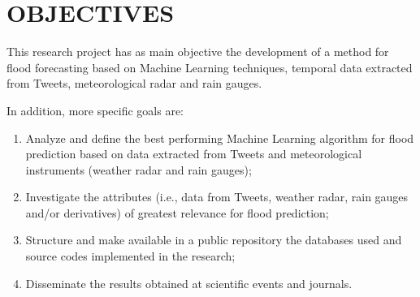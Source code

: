 \chapter{OBJECTIVES}\label{Obj}

This research project has as main objective the development of a method for flood forecasting based on Machine Learning techniques, temporal data extracted from Tweets, meteorological radar and rain gauges.

In addition, more specific goals are:

{%
\begin{enumerate}%
\item Analyze and define the best performing Machine Learning algorithm for flood prediction based on data extracted from Tweets and meteorological instruments (weather radar and rain gauges);

\item Investigate the attributes (i.e., data from Tweets, weather radar, rain gauges and/or derivatives) of greatest relevance for flood prediction; 

\item Structure and make available in a public repository the databases used and source codes implemented in the research;

\item Disseminate the results obtained at scientific events and journals.
\end{enumerate}
}